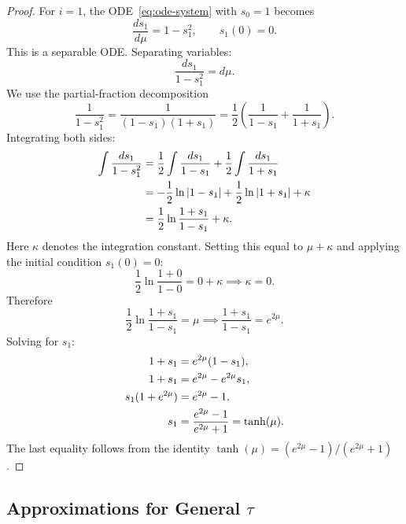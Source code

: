 \documentclass[11pt,a4paper]{article}
\begin{document}
\begin{proof}
For $i = 1$, the ODE~\eqref{eq:ode-system} with $s_0 = 1$ becomes
\begin{equation}\label{eq:ode-i1}
  \frac{ds_1}{d\mu} = 1 - s_1^2,
  \qquad s_1(0) = 0.
\end{equation}
This is a separable ODE.  Separating variables:
\begin{equation}\label{eq:sep}
  \frac{ds_1}{1 - s_1^2} = d\mu.
\end{equation}
We use the partial-fraction decomposition
\begin{equation}\label{eq:partial-frac}
  \frac{1}{1 - s_1^2}
  = \frac{1}{(1 - s_1)(1 + s_1)}
  = \frac{1}{2}\left(\frac{1}{1 - s_1} + \frac{1}{1 + s_1}\right).
\end{equation}
Integrating both sides:
\begin{align}
  \int \frac{ds_1}{1 - s_1^2}
  &= \frac{1}{2}\int\frac{ds_1}{1 - s_1}
     + \frac{1}{2}\int\frac{ds_1}{1 + s_1} \notag \\
  &= -\frac{1}{2}\ln|1 - s_1|
     + \frac{1}{2}\ln|1 + s_1| + \kappa \notag \\
  &= \frac{1}{2}\ln\frac{1 + s_1}{1 - s_1} + \kappa.
  \label{eq:int-lhs}
\end{align}
Here $\kappa$ denotes the integration constant.  Setting this equal to
$\mu + \kappa$ and applying the initial condition $s_1(0) = 0$:
\begin{equation}\label{eq:ic}
  \frac{1}{2}\ln\frac{1 + 0}{1 - 0} = 0 + \kappa
  \implies \kappa = 0.
\end{equation}
Therefore
\begin{equation}\label{eq:solve-for-s1}
  \frac{1}{2}\ln\frac{1 + s_1}{1 - s_1} = \mu
  \implies \frac{1 + s_1}{1 - s_1} = e^{2\mu}.
\end{equation}
Solving for $s_1$:
\begin{align}
  1 + s_1 &= e^{2\mu}(1 - s_1), \notag \\
  1 + s_1 &= e^{2\mu} - e^{2\mu} s_1, \notag \\
  s_1(1 + e^{2\mu}) &= e^{2\mu} - 1, \notag \\
  s_1 &= \frac{e^{2\mu} - 1}{e^{2\mu} + 1}
       = \tanh(\mu). \label{eq:s1-final}
\end{align}
The last equality follows from the identity
$\tanh(\mu) = (e^{2\mu}-1)/(e^{2\mu}+1)$.
\end{proof}

\subsection{Approximations for General \texorpdfstring{$\tau$}{tau}}
\label{ssec:general-tau}
\end{document}
